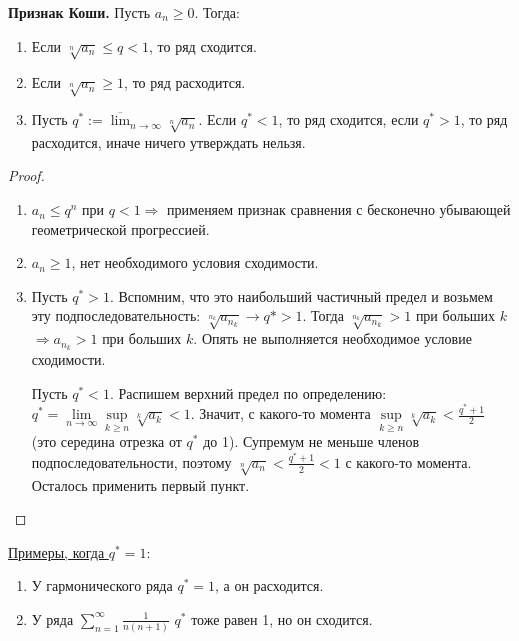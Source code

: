 \textbf{Признак Коши.} 
Пусть $a_n \geqslant 0$. Тогда:
\begin{enumerate}
    \item Если $\sqrt[n]{a_n} \leqslant q < 1$, то ряд сходится.
    \item Если $\sqrt[n]{a_n} \geqslant 1$, то ряд расходится.
    \item Пусть $q^* := \overline{\lim}_{n \to \infty} \sqrt[n]{a_n}$.
    Если $q^* < 1$, то ряд сходится, если $q^* > 1$, то ряд расходится, иначе ничего утверждать нельзя.
\end{enumerate}
\begin{proof} \quad

    \begin{enumerate}
        \item $a_n \leqslant q^n$ при $q < 1 \Rightarrow$ применяем признак сравнения с бесконечно убывающей геометрической прогрессией.
        \item $a_n \geqslant 1$, нет необходимого условия сходимости.
        \item Пусть $q^* > 1$. 
        Вспомним, что это наибольший частичный предел и возьмем эту подпоследовательность: $\sqrt[n_k]{a_{n_k}} \to q* > 1$.
        Тогда $\sqrt[n_k]{a_{n_k}} > 1$ при больших $k$ $\Rightarrow a_{n_k} > 1$ при больших $k$.
        Опять не выполняется необходимое условие сходимости.

        Пусть $q^* < 1$. 
        Распишем верхний предел по определению: $q^* = \lim\limits_{n \to \infty} \sup\limits_{k \geqslant n} \sqrt[k]{a_k} < 1$. 
        Значит, с какого-то момента $\sup\limits_{k \geqslant n} \sqrt[k]{a_k} < \frac{q^* + 1}{2}$ (это середина отрезка от $q^*$ до 1).
        Супремум не меньше членов подпоследовательности, поэтому $\sqrt[n]{a_n} < \frac{q^* + 1}{2} < 1$ с какого-то момента.
        Осталось применить первый пункт.
    \end{enumerate}
\end{proof}

\underline{Примеры, когда $q^* = 1:$}
\begin{enumerate}
    \item У гармонического ряда $q^* = 1$, а он расходится.
    \item У ряда $\sum\limits_{n=1}^{\infty} \frac{1}{n(n+1)}$ $q^*$ тоже равен 1, но он сходится. 
\end{enumerate}

\vspace{15mm}

